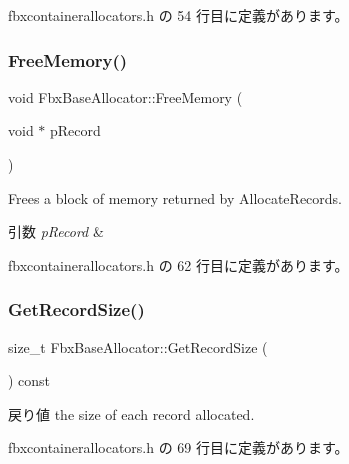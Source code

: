  fbxcontainerallocators.\+h の 54 行目に定義があります。

\mbox{\label{class_fbx_base_allocator_a345b6d46e57e8313966a5f3654d1195c}} 
\subsubsection{\texorpdfstring{Free\+Memory()}{FreeMemory()}}
{\footnotesize\ttfamily void Fbx\+Base\+Allocator\+::\+Free\+Memory (\begin{DoxyParamCaption}\item[{void $\ast$}]{p\+Record }\end{DoxyParamCaption})\hspace{0.3cm}{\ttfamily [inline]}}

Frees a block of memory returned by Allocate\+Records. 
\begin{DoxyParams}{引数}
{\em p\+Record} & \\
\hline
\end{DoxyParams}


 fbxcontainerallocators.\+h の 62 行目に定義があります。

\mbox{\label{class_fbx_base_allocator_ab7aa3164aa6fc973baca1515b494198f}} 
\subsubsection{\texorpdfstring{Get\+Record\+Size()}{GetRecordSize()}}
{\footnotesize\ttfamily size\+\_\+t Fbx\+Base\+Allocator\+::\+Get\+Record\+Size (\begin{DoxyParamCaption}{ }\end{DoxyParamCaption}) const\hspace{0.3cm}{\ttfamily [inline]}}

\begin{DoxyReturn}{戻り値}
the size of each record allocated. 
\end{DoxyReturn}


 fbxcontainerallocators.\+h の 69 行目に定義があります。

\mbox{\label{class_fbx_base_allocator_ad84870f23a2b067b3bade2604dab2621}} 
